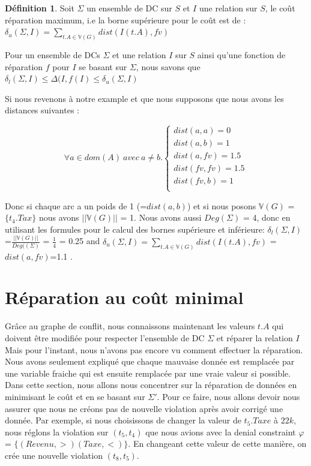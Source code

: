 \documentclass[letterpaper, 12pt]{report}
\theoremstyle{definition}
\newtheorem{mydef}{Définition}
\begin{document}
\begin{mydef}
\label{defBorneSup}
Soit $\Sigma$ un ensemble de DC sur $S$ et $I$ une relation sur $S$, le coût réparation maximum, i.e la borne supérieure pour le coût est de :
$\delta_u(\Sigma,I) = \sum_{t.A \in \mathbb{V}(G)} dist(I(t.A),fv)$
\end{mydef}

Pour un ensemble de DCs $\Sigma$ et une relation $I$ sur $S$ ainsi qu'une fonction de réparation $f$ pour $I$ se basant sur $\Sigma$, nous savons que $\delta_l(\Sigma,I) \leq \Delta(I,f(I) \leq \delta_u(\Sigma,I)$

Si nous revenons à notre example et que nous supposons que nous avons les distances suivantes :

$$
\forall a \in dom(A) \ avec \ a \neq b.
\left\{
	\begin{array}{ll}
	   dist(a,a)=0\\
	   dist(a,b)=1\\
	   dist(a,fv)=1.5\\
	   dist(fv,fv)=1.5\\
	   dist(fv,b)=1\\
	\end{array}
\right.
$$

Donc si chaque arc a un poids de 1 (=$ dist(a,b)$) et si nous posons $\mathbb{V}(G)$ = $\{t_4.Tax \}$ nous avons $||\mathbb{V}(G)||$ = 1. Nous avons aussi $Deg(\Sigma)$ = 4, donc en utilisant les formules pour le calcul des bornes supérieure et inférieure: $\delta_l(\Sigma,I)$=$\frac{||\mathbb{V}(G)||}{Deg((\Sigma)}$ = $\frac{1}{4}$ = 0.25 and $\delta_u(\Sigma,I) = \sum_{t.A \in \mathbb{V}(G)} dist(I(t.A),fv)$ = $dist(a,fv)$=1.1 .

\section{Réparation au coût minimal}

Grâce au graphe de conflit, nous connaissons maintenant les valeurs $t.A$ qui doivent être modifiée pour respecter l'ensemble de DC $\Sigma$ et réparer la relation $I$  Mais pour l'instant, nous n'avons pas encore vu comment effectuer la réparation. Nous avons seulement expliqué que chaque mauvaise donnée est remplacée par une variable fraiche qui est ensuite remplacée par une vraie valeur si possible. Dans cette section, nous allons nous concentrer sur la réparation de données en minimisant le coût et en se basant sur $\Sigma'$. Pour ce faire, nous allons devoir nous assurer que nous ne créons pas de nouvelle violation après avoir corrigé une donnée. Par exemple, si nous choisissons de changer la valeur de $t_5.Taxe$ à $22k$, nous réglons la violation sur $(t_5,t_4)$ que nous avions avec la denial constraint $\varphi$ = $\{ (Revenu,>)(Taxe,<)\} $. En changeant cette valeur de cette manière, on crée une nouvelle violation $(t_8,t_5)$.\\
\end{document}
